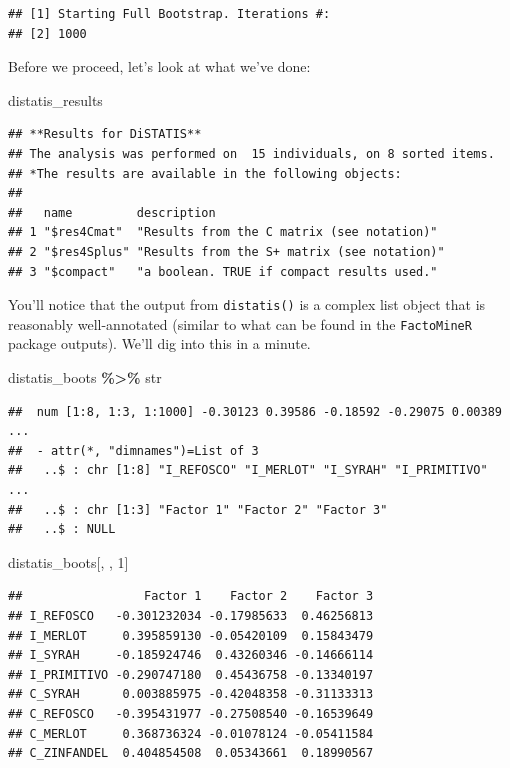\documentclass[
]{book}
\newenvironment{Shaded}{\begin{snugshade}}{\end{snugshade}}
\newcommand{\DecValTok}[1]{\textcolor[rgb]{0.00,0.00,0.81}{#1}}
\newcommand{\NormalTok}[1]{#1}
\newcommand{\SpecialCharTok}[1]{\textcolor[rgb]{0.81,0.36,0.00}{\textbf{#1}}}
\begin{document}
\begin{verbatim}
## [1] Starting Full Bootstrap. Iterations #: 
## [2] 1000
\end{verbatim}

Before we proceed, let's look at what we've done:

\begin{Shaded}
\begin{Highlighting}[]
\NormalTok{distatis\_results}
\end{Highlighting}
\end{Shaded}

\begin{verbatim}
## **Results for DiSTATIS**
## The analysis was performed on  15 individuals, on 8 sorted items.
## *The results are available in the following objects:
## 
##   name         description                                
## 1 "$res4Cmat"  "Results from the C matrix (see notation)" 
## 2 "$res4Splus" "Results from the S+ matrix (see notation)"
## 3 "$compact"   "a boolean. TRUE if compact results used."
\end{verbatim}

You'll notice that the output from \texttt{distatis()} is a complex list object that is reasonably well-annotated (similar to what can be found in the \texttt{FactoMineR} package outputs). We'll dig into this in a minute.

\begin{Shaded}
\begin{Highlighting}[]
\NormalTok{distatis\_boots }\SpecialCharTok{\%\textgreater{}\%}\NormalTok{ str}
\end{Highlighting}
\end{Shaded}

\begin{verbatim}
##  num [1:8, 1:3, 1:1000] -0.30123 0.39586 -0.18592 -0.29075 0.00389 ...
##  - attr(*, "dimnames")=List of 3
##   ..$ : chr [1:8] "I_REFOSCO" "I_MERLOT" "I_SYRAH" "I_PRIMITIVO" ...
##   ..$ : chr [1:3] "Factor 1" "Factor 2" "Factor 3"
##   ..$ : NULL
\end{verbatim}

\begin{Shaded}
\begin{Highlighting}[]
\NormalTok{distatis\_boots[, , }\DecValTok{1}\NormalTok{]}
\end{Highlighting}
\end{Shaded}

\begin{verbatim}
##                 Factor 1    Factor 2    Factor 3
## I_REFOSCO   -0.301232034 -0.17985633  0.46256813
## I_MERLOT     0.395859130 -0.05420109  0.15843479
## I_SYRAH     -0.185924746  0.43260346 -0.14666114
## I_PRIMITIVO -0.290747180  0.45436758 -0.13340197
## C_SYRAH      0.003885975 -0.42048358 -0.31133313
## C_REFOSCO   -0.395431977 -0.27508540 -0.16539649
## C_MERLOT     0.368736324 -0.01078124 -0.05411584
## C_ZINFANDEL  0.404854508  0.05343661  0.18990567
\end{verbatim}
\end{document}
